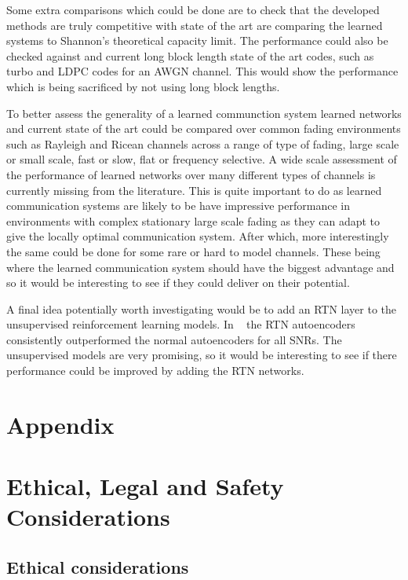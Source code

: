 \documentclass[12pt,onecolumn,letterpaper]{article}
\begin{document}
Some extra comparisons which could be done are to check that the developed methods are truly competitive with state of the art are comparing the learned systems to Shannon's theoretical capacity limit. The performance could also be checked against and current long block length state of the art codes, such as turbo and LDPC codes for an AWGN channel. This would show the performance which is being sacrificed by not using long block lengths.

To better assess the generality of a learned communction system learned networks and current state of the art could be compared over common fading environments such as Rayleigh and Ricean channels across a range of type of fading, large scale or small scale, fast or slow, flat or frequency selective. A wide scale assessment of the performance of learned networks over many different types of channels is currently missing from the literature. This is quite important to do as learned communication systems are likely to be have impressive performance in environments with complex stationary large scale fading as they can adapt to give the locally optimal communication system. After which, more interestingly the same could be done for some rare or hard to model channels. These being where the learned communication system should have the biggest advantage and so it would be interesting to see if they could deliver on their potential.

A final idea potentially worth investigating would be to add an RTN layer to the unsupervised reinforcement learning models. In ~\cite{oShea} the RTN autoencoders consistently outperformed the normal autoencoders for all SNRs. The unsupervised models are very promising, so it would be interesting to see if there performance could be improved by adding the RTN networks.

\FloatBarrier
\appendix
\section{Appendix}

\section{Ethical, Legal and Safety Considerations}

\subsection{Ethical considerations}
\end{document}
